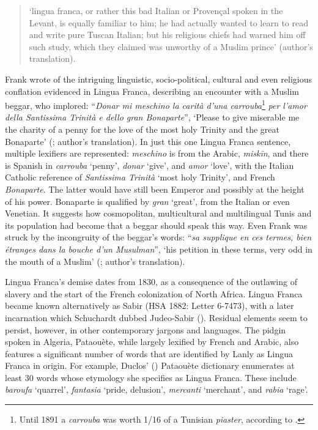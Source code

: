 \documentclass[output=paper]{langsci/langscibook}
\begin{document}
	\begin{quote}
		‘lingua franca, or rather this bad Italian or Provençal spoken in the Levant, is equally familiar to him; he had actually wanted to learn to read and write  pure Tuscan Italian; but his religious chiefs had warned him off such study, which they claimed was unworthy of a Muslim prince’ (author's translation).
	\end{quote}
	
	Frank wrote of the intriguing linguistic, socio-political, cultural and even religious conflation evidenced in Lingua Franca, describing an encounter with a Muslim beggar, who implored: “\textit{Donar mi meschino la carità d’una carrouba}\footnote{Until 1891 a \textit{carrouba} was worth 1/16 of a Tunisian \textit{piaster}, according to \citet{Rossetti1999}.} \textit{per l’amor della Santissima Trinità e dello gran Bonaparte}”, ‘Please to give miserable me the charity of a penny for the love of the most holy Trinity and the great Bonaparte’ (\citealt[101]{Frank1850}; author's translation). In just this one Lingua Franca sentence, multiple lexifiers are represented: \textit{meschino} is from the Arabic, \textit{miskīn}, and there is Spanish in \textit{carrouba} ‘penny’, \textit{donar} ‘give’, and \textit{amor} ‘love’, with the Italian Catholic reference of \textit{Santissima Trinità} ‘most holy Trinity’, and French \textit{Bonaparte}. The latter would have still been Emperor and possibly at the height of his power. Bonaparte is qualified by \textit{gran} ‘great’, from the Italian or even Venetian. It suggests how cosmopolitan, multicultural and multilingual Tunis and its population had become that a beggar should speak this way. Even Frank was struck by the incongruity of the beggar’s words: ``\textit{sa supplique en ces termes, bien étranges dans la bouche d’un Musulman}'', ‘his petition in these terms, very odd in the mouth of a Muslim’ (\citealt[101]{Frank1850}; author's translation).
	
	Lingua Franca’s demise dates from 1830, as a consequence of the outlawing of slavery and the start of the French colonization of North Africa. Lingua Franca became known alternatively as Sabir (HSA 1882: Letter 6-7473), with a later incarnation which Schuchardt dubbed Judeo-Sabir (\citealt[87]{Schuchardt1909}). Residual elements seem to persist, however, in other contemporary jargons and languages. The pidgin spoken in Algeria, Pataouète, while largely lexified by French and Arabic, also features a significant number of words that are identified by Lanly as Lingua Franca in origin. For example, Duclos’ (\citeyear{Duclos1992}) Pataouète dictionary enumerates at least 30 words whose etymology she specifies as Lingua Franca. These include \textit{baroufa} ‘quarrel', \textit{fantasia} ‘pride, delusion’, \textit{mercanti} ‘merchant’, and \textit{rabia} ‘rage’.
	
\end{document}
